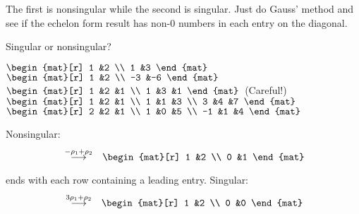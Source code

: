 \begin{exercises}
\begin{answer}
       The first is nonsingular while the second is singular.
       Just do Gauss' method and see if the echelon form result has
       non-$0$ numbers in each entry on the diagonal.
     \end{answer}
  \recommended \item 
    Singular or nonsingular?
    \begin{exparts*}
      \partsitem \(
        \begin{mat}[r]
          1  &2  \\
          1  &3
        \end{mat}   \)
      \partsitem \(
        \begin{mat}[r]
          1  &2  \\
         -3  &-6
        \end{mat}   \)
      \partsitem \(
        \begin{mat}[r]
          1  &2  &1  \\
          1  &3  &1
        \end{mat}   \)~(Careful!)
      \partsitem \(
        \begin{mat}[r]
          1  &2  &1  \\
          1  &1  &3  \\
          3  &4  &7
        \end{mat}   \)
      \partsitem \(
        \begin{mat}[r]
          2  &2  &1  \\
          1  &0  &5  \\
         -1  &1  &4
        \end{mat}   \)
    \end{exparts*}
    \begin{answer}
      \begin{exparts}
      \partsitem Nonsingular:
        \begin{eqnarray*}
          &\grstep{-\rho_1+\rho_2}
          &\begin{mat}[r]
            1  &2  \\
            0  &1
          \end{mat}
        \end{eqnarray*}
        ends with each row containing a leading entry.
      \partsitem Singular:
        \begin{eqnarray*}
          &\grstep{3\rho_1+\rho_2}
          &\begin{mat}[r]
            1  &2  \\
            0  &0
          \end{mat}

\end{eqnarray*}
\end{exparts}
\end{answer}
\end{exercises}
